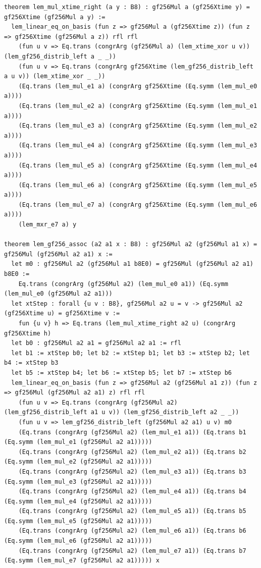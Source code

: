 \documentclass[11pt,letterpaper]{article}
\theoremstyle{spectralthm}
\begin{document}
\begin{lstlisting}[language=Lean4,caption={Standalone Pure Init.Prelude Term-Mode Lean 4 Kernel Suite (thm30--thm61, v0.0.0, 0 sorry, 0 axioms).},label={lst:lean_unified}]
theorem lem_mul_xtime_right (a y : B8) : gf256Mul a (gf256Xtime y) = gf256Xtime (gf256Mul a y) :=
  lem_linear_eq_on_basis (fun z => gf256Mul a (gf256Xtime z)) (fun z => gf256Xtime (gf256Mul a z)) rfl rfl
    (fun u v => Eq.trans (congrArg (gf256Mul a) (lem_xtime_xor u v)) (lem_gf256_distrib_left a _ _))
    (fun u v => Eq.trans (congrArg gf256Xtime (lem_gf256_distrib_left a u v)) (lem_xtime_xor _ _))
    (Eq.trans (lem_mul_e1 a) (congrArg gf256Xtime (Eq.symm (lem_mul_e0 a))))
    (Eq.trans (lem_mul_e2 a) (congrArg gf256Xtime (Eq.symm (lem_mul_e1 a))))
    (Eq.trans (lem_mul_e3 a) (congrArg gf256Xtime (Eq.symm (lem_mul_e2 a))))
    (Eq.trans (lem_mul_e4 a) (congrArg gf256Xtime (Eq.symm (lem_mul_e3 a))))
    (Eq.trans (lem_mul_e5 a) (congrArg gf256Xtime (Eq.symm (lem_mul_e4 a))))
    (Eq.trans (lem_mul_e6 a) (congrArg gf256Xtime (Eq.symm (lem_mul_e5 a))))
    (Eq.trans (lem_mul_e7 a) (congrArg gf256Xtime (Eq.symm (lem_mul_e6 a))))
    (lem_mxr_e7 a) y

theorem lem_gf256_assoc (a2 a1 x : B8) : gf256Mul a2 (gf256Mul a1 x) = gf256Mul (gf256Mul a2 a1) x :=
  let m0 : gf256Mul a2 (gf256Mul a1 b8E0) = gf256Mul (gf256Mul a2 a1) b8E0 :=
    Eq.trans (congrArg (gf256Mul a2) (lem_mul_e0 a1)) (Eq.symm (lem_mul_e0 (gf256Mul a2 a1)))
  let xtStep : forall {u v : B8}, gf256Mul a2 u = v -> gf256Mul a2 (gf256Xtime u) = gf256Xtime v :=
    fun {u v} h => Eq.trans (lem_mul_xtime_right a2 u) (congrArg gf256Xtime h)
  let b0 : gf256Mul a2 a1 = gf256Mul a2 a1 := rfl
  let b1 := xtStep b0; let b2 := xtStep b1; let b3 := xtStep b2; let b4 := xtStep b3
  let b5 := xtStep b4; let b6 := xtStep b5; let b7 := xtStep b6
  lem_linear_eq_on_basis (fun z => gf256Mul a2 (gf256Mul a1 z)) (fun z => gf256Mul (gf256Mul a2 a1) z) rfl rfl
    (fun u v => Eq.trans (congrArg (gf256Mul a2) (lem_gf256_distrib_left a1 u v)) (lem_gf256_distrib_left a2 _ _))
    (fun u v => lem_gf256_distrib_left (gf256Mul a2 a1) u v) m0
    (Eq.trans (congrArg (gf256Mul a2) (lem_mul_e1 a1)) (Eq.trans b1 (Eq.symm (lem_mul_e1 (gf256Mul a2 a1)))))
    (Eq.trans (congrArg (gf256Mul a2) (lem_mul_e2 a1)) (Eq.trans b2 (Eq.symm (lem_mul_e2 (gf256Mul a2 a1)))))
    (Eq.trans (congrArg (gf256Mul a2) (lem_mul_e3 a1)) (Eq.trans b3 (Eq.symm (lem_mul_e3 (gf256Mul a2 a1)))))
    (Eq.trans (congrArg (gf256Mul a2) (lem_mul_e4 a1)) (Eq.trans b4 (Eq.symm (lem_mul_e4 (gf256Mul a2 a1)))))
    (Eq.trans (congrArg (gf256Mul a2) (lem_mul_e5 a1)) (Eq.trans b5 (Eq.symm (lem_mul_e5 (gf256Mul a2 a1)))))
    (Eq.trans (congrArg (gf256Mul a2) (lem_mul_e6 a1)) (Eq.trans b6 (Eq.symm (lem_mul_e6 (gf256Mul a2 a1)))))
    (Eq.trans (congrArg (gf256Mul a2) (lem_mul_e7 a1)) (Eq.trans b7 (Eq.symm (lem_mul_e7 (gf256Mul a2 a1))))) x


\end{lstlisting}
\end{document}
